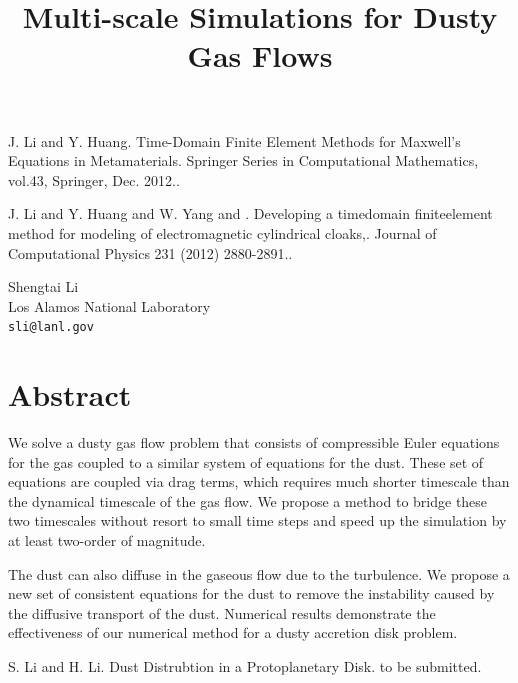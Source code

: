 \documentclass[article, A4, 11pt]{llncs}%
\begin{document}

\begin{thebibliography}{10}
{\sc J. Li and Y. Huang}. {Time-Domain Finite Element Methods for Maxwell's Equations in Metamaterials}.  Springer Series in Computational Mathematics, vol.43, Springer, Dec. 2012..

{\sc J. Li and Y. Huang and W. Yang and  }. {Developing a timedomain finiteelement method for modeling of electromagnetic cylindrical cloaks,}. Journal of Computational Physics 231 (2012) 2880-2891..
\end{thebibliography} %

\title{Multi-scale Simulations for Dusty Gas Flows}
 \author{} \institute{}
\maketitle
\begin{center}
{\large Shengtai Li}\\
Los Alamos National Laboratory\\
{\tt sli@lanl.gov}
\end{center}

\section*{Abstract}
We solve a dusty gas flow problem that consists of compressible Euler equations for the gas coupled to a similar system of equations for the dust. These set of equations are coupled via drag terms, which requires much shorter timescale than the dynamical timescale of the gas flow. We propose a method to bridge these two timescales without resort to small time steps and speed up the simulation by at least two-order of magnitude. 

The dust can also diffuse in the gaseous flow due to the turbulence. We propose a new set of consistent equations for the dust to remove the instability caused by the diffusive transport of the dust. Numerical results demonstrate the effectiveness of our numerical method for a dusty accretion disk problem. 


\begin{thebibliography}{10}
{\sc S. Li and H. Li}. {Dust Distrubtion in a Protoplanetary Disk}. to be submitted.
\end{thebibliography} %
\end{document}
